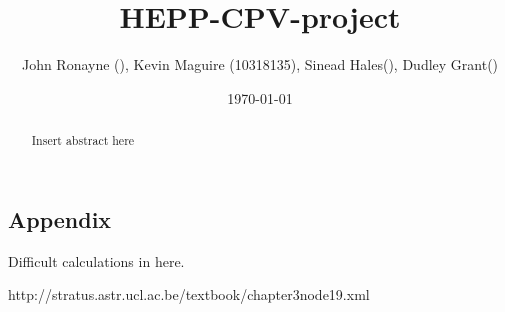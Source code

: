 \documentclass[a4paper,floatfix,aps,prd,amsmath,amssymb]{revtex4}
\begin{document}
\title{HEPP-CPV-project}


\author{John Ronayne (), Kevin Maguire (10318135), Sinead Hales(), Dudley Grant()}

\date{\today}

\begin{abstract}

Insert abstract here

\end{abstract}

\maketitle
 






\begin{appendix}
\section{Appendix}
Difficult calculations in here.
\end{appendix}
 
\begin{thebibliography}{10}
http://stratus.astr.ucl.ac.be/textbook/chapter3\textunderscore node19.xml

\end{thebibliography}
\end{document}
